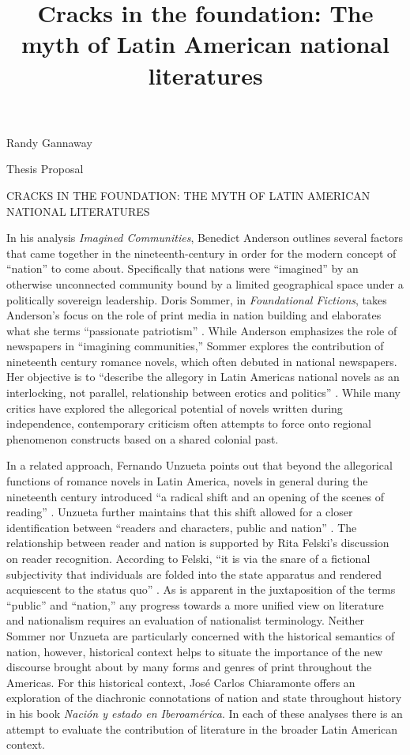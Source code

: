 \documentclass[12pt]{report}
\title{Cracks in the foundation: The myth of Latin American national literatures}
\begin{document}

\noindent
Randy Gannaway

\noindent
Thesis Proposal

\begin{center}
CRACKS IN THE FOUNDATION: THE MYTH OF LATIN AMERICAN NATIONAL LITERATURES
\end{center}

In his analysis \textit{Imagined Communities}, Benedict Anderson outlines several factors that came together in the nineteenth-century in order for the modern concept of \enquote{nation} to come about. 
Specifically that nations were \enquote{imagined} by an otherwise unconnected community bound by a limited geographical space under a politically sovereign leadership\nocite{Anderson2006}. 
Doris Sommer, in \textit{Foundational Fictions}, takes Anderson's focus on the role of print media in nation building and elaborates what she terms \enquote{passionate patriotism} \autocite*[33]{Sommer1991}. 
While Anderson emphasizes the role of newspapers in \enquote{imagining communities,} Sommer explores the contribution of nineteenth century romance novels, which often debuted in national newspapers. 
Her objective is to \enquote{describe the allegory in Latin Americas national novels as an interlocking, not parallel, relationship between erotics and politics} \autocite[43]{Sommer1991}. 
While many critics have explored the allegorical potential of novels written during independence, contemporary criticism often attempts to force onto regional phenomenon constructs based on a shared colonial past.

In a related approach, Fernando Unzueta points out that beyond the allegorical functions of romance novels in Latin America, novels in general during the nineteenth century introduced \enquote{a radical shift and an opening of the scenes of reading} \autocite*[78]{Unzueta2002}. 
Unzueta further maintains that this shift allowed for a closer identification between \enquote{readers and characters, public and nation} \autocite*[78]{Unzueta2002}. 
The relationship between reader and nation is supported by Rita Felski's discussion on reader recognition. According to Felski, \enquote{it is via the snare of a fictional subjectivity that individuals are folded into the state apparatus and rendered acquiescent to the status quo} \autocite*[27]{Felski2008}. As is apparent in the juxtaposition of the terms \enquote{public} and \enquote{nation,} any progress towards a more unified view on literature and nationalism requires an evaluation of nationalist terminology. Neither Sommer nor Unzueta are particularly concerned with the historical semantics of nation, however, historical context helps to situate the importance of the new discourse brought about by many forms and genres of print throughout the Americas. 
For this historical context, José Carlos Chiaramonte offers an exploration of the diachronic connotations of nation and state throughout history in his book \textit{Nación y estado en Iberoamérica}\nocite{Chiaramonte2004}. In each of these analyses there is an attempt to evaluate the contribution of literature in the broader Latin American context.
\end{document}
